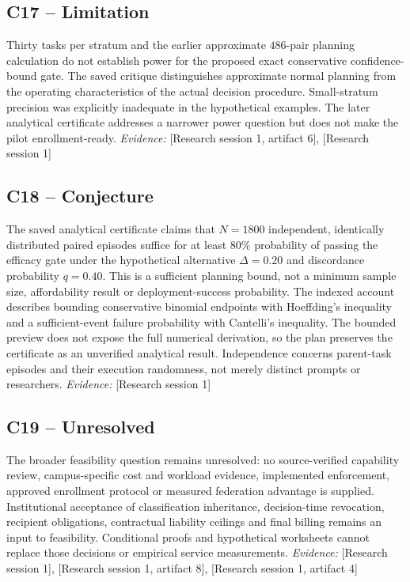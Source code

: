 \documentclass[11pt]{article}
\begin{document}
\subsection{C17 -- Limitation}
Thirty tasks per stratum and the earlier approximate $486$-pair planning calculation do not establish power for the proposed exact conservative confidence-bound gate.
The saved critique distinguishes approximate normal planning from the operating characteristics of the actual decision procedure. Small-stratum precision was explicitly inadequate in the hypothetical examples. The later analytical certificate addresses a narrower power question but does not make the pilot enrollment-ready.
\textit{Evidence: }[Research session 1, artifact 6], [Research session 1]
\subsection{C18 -- Conjecture}
The saved analytical certificate claims that $N=1800$ independent, identically distributed paired episodes suffice for at least $80\%$ probability of passing the efficacy gate under the hypothetical alternative $\Delta=0.20$ and discordance probability $q=0.40$. This is a sufficient planning bound, not a minimum sample size, affordability result or deployment-success probability.
The indexed account describes bounding conservative binomial endpoints with Hoeffding's inequality and a sufficient-event failure probability with Cantelli's inequality. The bounded preview does not expose the full numerical derivation, so the plan preserves the certificate as an unverified analytical result. Independence concerns parent-task episodes and their execution randomness, not merely distinct prompts or researchers.
\textit{Evidence: }[Research session 1]
\subsection{C19 -- Unresolved}
The broader feasibility question remains unresolved: no source-verified capability review, campus-specific cost and workload evidence, implemented enforcement, approved enrollment protocol or measured federation advantage is supplied.
Institutional acceptance of classification inheritance, decision-time revocation, recipient obligations, contractual liability ceilings and final billing remains an input to feasibility. Conditional proofs and hypothetical worksheets cannot replace those decisions or empirical service measurements.
\textit{Evidence: }[Research session 1], [Research session 1, artifact 8], [Research session 1, artifact 4]
\end{document}
